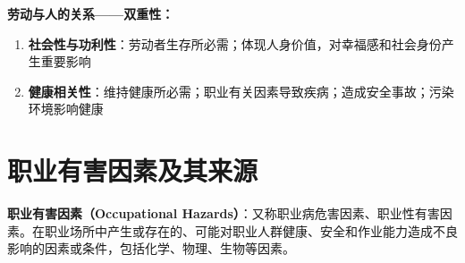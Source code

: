 \begin{keybox}
\textbf{劳动与人的关系——双重性：}
\begin{enumerate}[leftmargin=*]
    \item \textbf{社会性与功利性}：劳动者生存所必需；体现人身价值，对幸福感和社会身份产生重要影响
    \item \textbf{健康相关性}：维持健康所必需；职业有关因素导致疾病；造成安全事故；污染环境影响健康
\end{enumerate}
\end{keybox}

\section{职业有害因素及其来源}

\begin{defbox}
\textbf{职业有害因素（Occupational Hazards）}：又称职业病危害因素、职业性有害因素。在职业场所中产生或存在的、可能对职业人群健康、安全和作业能力造成不良影响的因素或条件，包括化学、物理、生物等因素。
\end{defbox}

